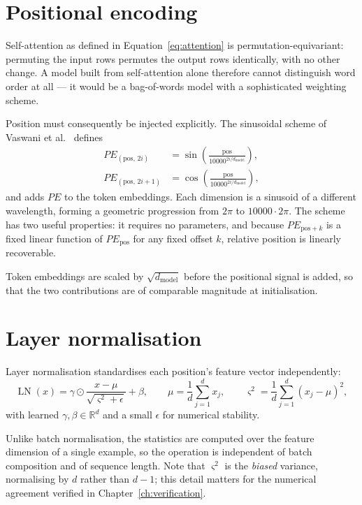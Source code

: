 \section{Positional encoding}

Self-attention as defined in Equation~\ref{eq:attention} is permutation-equivariant: permuting the
input rows permutes the output rows identically, with no other change. A model built from
self-attention alone therefore cannot distinguish word order at all --- it would be a bag-of-words
model with a sophisticated weighting scheme.

Position must consequently be injected explicitly. The sinusoidal scheme of
Vaswani et al.\ \cite{vaswani2017} defines
\begin{align}
PE_{(\text{pos},\,2i)}   &= \sin\!\left(\frac{\text{pos}}{10000^{2i/d_{\text{model}}}}\right), \\
PE_{(\text{pos},\,2i+1)} &= \cos\!\left(\frac{\text{pos}}{10000^{2i/d_{\text{model}}}}\right),
\end{align}
and adds $PE$ to the token embeddings. Each dimension is a sinusoid of a different wavelength,
forming a geometric progression from $2\pi$ to $10000\cdot 2\pi$. The scheme has two useful
properties: it requires no parameters, and because $PE_{\text{pos}+k}$ is a fixed linear function
of $PE_{\text{pos}}$ for any fixed offset $k$, relative position is linearly recoverable.

Token embeddings are scaled by $\sqrt{d_{\text{model}}}$ before the positional signal is added, so
that the two contributions are of comparable magnitude at initialisation.

\section{Layer normalisation}

Layer normalisation \cite{ba2016} standardises each position's feature vector independently:
\begin{equation}
\operatorname{LN}(x) = \gamma \odot \frac{x - \mu}{\sqrt{\varsigma^2 + \epsilon}} + \beta,
\qquad
\mu = \frac{1}{d}\sum_{j=1}^{d} x_j,
\qquad
\varsigma^2 = \frac{1}{d}\sum_{j=1}^{d} (x_j - \mu)^2 ,
\end{equation}
with learned $\gamma, \beta \in \mathbb{R}^{d}$ and a small $\epsilon$ for numerical stability.

Unlike batch normalisation, the statistics are computed over the feature dimension of a single
example, so the operation is independent of batch composition and of sequence length. Note that
$\varsigma^2$ is the \emph{biased} variance, normalising by $d$ rather than $d-1$; this detail
matters for the numerical agreement verified in Chapter~\ref{ch:verification}.

